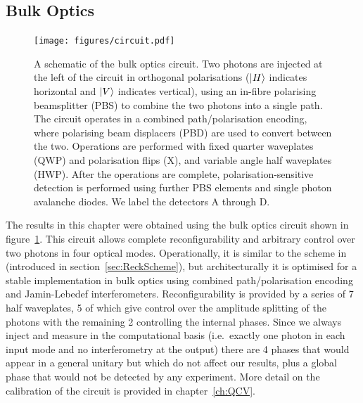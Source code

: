 \subsection{Bulk Optics}
\label{sec:BulkReck}
\begin{figure}[t]
  \centering
  \texttt{[image: figures/circuit.pdf]}
  \caption[A schematic of the bulk optics circuit used for simulations.]
  {A schematic of the bulk optics circuit. Two photons are injected at
  the left of the circuit in orthogonal polarisations (\(\left|H\right\rangle\) indicates
  horizontal and \(\left|V\right\rangle\) indicates vertical), using an in-fibre polarising
  beamsplitter (PBS) to combine the two photons into a single path. The circuit
  operates in a combined path/polarisation encoding, where polarising beam
  displacers (PBD) are used to convert between the two. Operations are performed
  with fixed quarter waveplates (QWP) and polarisation flips (X), and variable
  angle half waveplates (HWP). After the operations are complete,
  polarisation-sensitive detection is performed using further PBS elements and
  single photon avalanche diodes. We label the detectors A through D.}
  \label{fig:circuit}
\end{figure}
The results in this chapter were obtained using the bulk optics circuit shown in
figure~\ref{fig:circuit}. This circuit allows complete reconfigurability and
arbitrary control over two photons in four optical modes. Operationally, it is
similar to the scheme in~\cite{reck} (introduced in
section~\ref{sec:ReckScheme}), but architecturally it is optimised for a stable
implementation in bulk optics using combined path/polarisation encoding and 
Jamin-Lebedef interferometers. Reconfigurability is provided by a series of 7
half waveplates, 5 of which give control over the amplitude splitting of the
photons with the remaining 2 controlling the internal phases. Since we always
inject and measure in the computational basis (i.e.\ exactly one photon in each
input mode and no interferometry at the output) there are 4 phases that would
appear in a general unitary but which do not affect our results, plus a global
phase that would not be detected by any experiment. More detail on the
calibration of the circuit is provided in chapter~\ref{ch:QCV}.

